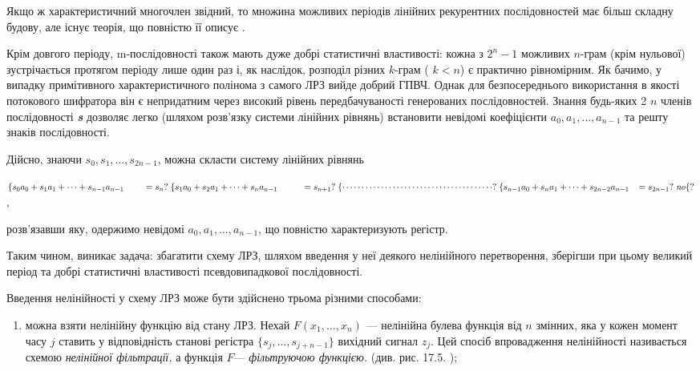 Якщо ж характеристичний многочлен звідний, то множина можливих періодів лінійних
рекурентних послідовностей має більш складну будову, але існує теорія, що
повністю її описує .

Крім довгого періоду, m{}-послідовності також мають дуже добрі статистичні
властивості: кожна з  $2^n-1$ можливих  $n${}-грам (крім нульової)
зустрічається протягом періоду лише один раз і, як наслідок, розподіл різних 
$k$-грам ( $k<n$) є практично рівномірним. Як бачимо, у випадку
примітивного характеристичного полінома з самого ЛРЗ вийде добрий ГПВЧ. Однак
для безпосереднього використання в якості потокового шифратора він є
непридатним через високий рівень передбачуваності генерованих послідовностей.
Знання будь-яких  2 $n$ членів послідовності \textbf{\textit{s}} дозволяє
легко (шляхом розв’язку системи лінійних рівнянь) встановити невідомі
коефіцієнти  $a_{0},a_1,\dots,a_{n-1}$ та решту
знаків послідовності.

Дійсно, знаючи  $s_{0},s_1,\dots,s_{2n-1}$, можна
скласти систему лінійних рівнянь


\bigskip

{\centering

${\begin{matrix}\left\{ s_{0}a_{0}+s_{1}a_{1}+\dots+s_{n-1}a_{n-1}\;\;\;\;\;\;\;\;=s_{n}? \right.\left\{ s_{1}a_{0}+s_{2}a_{1}+\dots+s_{n}a_{n-1}\;\;\;\;\;\;\;\;\;\;=s_{n+1}? \right.\left\{\cdots
\cdots \cdots \cdots \cdots \cdots \cdots \cdots \cdots \cdots \cdots \cdots
\cdots
?\right.\left\{ s_{n-1}a_{0}+s_{n}a_{1}+\dots+s_{2n-2}a_{n-1}\;\;\;=s_{2n-1}? \right.\mathit{no}\hfill\null
\end{matrix}\{?}$,
\par}


\bigskip

розв’язавши яку, одержимо невідомі 
$a_{0},a_1,\dots,a_{n-1}$, що повністю
характеризують регістр.

Таким чином, виникає задача: збагатити схему ЛРЗ, шляхом введення у неї деякого
нелінійного перетворення, зберігши при цьому великий період та добрі
статистичні властивості псевдовипадкової послідовності.

Введення нелінійності у схему ЛРЗ може бути здійснено трьома різними способами:

\liststyleWWviiiNumxlvii
\begin{enumerate}
\item можна взяти нелінійну функцію від стану ЛРЗ. Нехай 
$F(x_{1},\dots,x_n)$ --- нелінійна булева функція від 
$n$ змінних, яка у кожен момент часу  $j$ ставить у відповідність станові
регістра  $\{s_j,\dots,s_{j+n-1}\}$ вихідний сигнал 
$z_j$. Цей спосіб впровадження нелінійності називається схемою
\textit{нелінійної фільтрації, }а функція  $F$---  \textit{фільтруючою
функцією. }(див. рис.\textcolor{red}{ }17.5. );
\end{enumerate}

